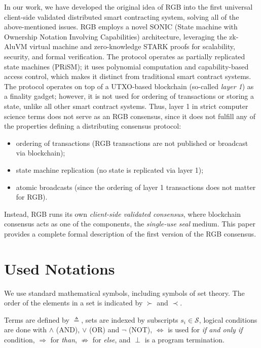 \documentclass[9pt,oneside]{amsart}
\begin{document}
\begin{multicols}{2}
In our work, we have developed the original idea of RGB into the first universal client-side validated
distributed smart contracting system, solving all of the above-mentioned issues.
RGB employs a novel SONIC (State machine with Ownership Notation Involving Capabilities) architecture,
leveraging the zk-AluVM virtual machine and zero-knowledge STARK proofs
for scalability, security, and formal verification.
The protocol operates as partially replicated state machines (PRiSM);
it uses polynomial computation and capability-based access control,
which makes it distinct from traditional smart contract systems.
The protocol operates on top of a UTXO-based blockchain (so-called \emph{layer 1})
as a finality gadget; however, it is not used for ordering of transactions or storing a state,
unlike all other smart contract systems.
Thus, layer 1 in strict computer science terms does not serve as an RGB consensus,
since it does not fulfill any of the properties defining a distributing consensus protocol:

\begin{itemize}
    \item ordering of transactions (RGB transactions are not published or broadcast via blockchain);
    \item state machine replication (no state is replicated via layer 1);
    \item atomic broadcasts (since the ordering of layer 1 transactions does not matter for RGB).
\end{itemize}

Instead, RGB runs its own \emph{client-side validated consensus}, where blockchain consensus
acts as one of the components, the \emph{single-use seal} medium.
This paper provides a complete formal description of the first version of the RGB consensus.

\section{Used Notations}

We use standard mathematical symbols, including symbols of set theory.
The order of the elements in a set is indicated by $\succ$ and $\prec$.

Terms are defined by $\triangleq$, sets are indexed by subscripts $s_i \in \mathcal{S}$,
logical conditions are done with $\land$ (AND), $\lor$ (OR) and $\lnot$ (NOT),
$\Longleftrightarrow$ is used for \emph{if and only if} condition,
$\Rightarrow$ for \emph{than}, $\nRightarrow$ for \emph{else}, and $\perp$ is a program termination.


\end{multicols}
\end{document}
